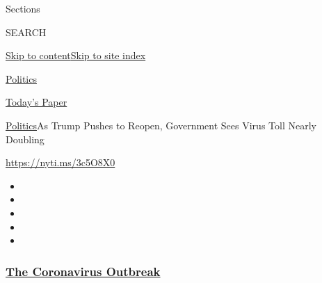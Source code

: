 Sections

SEARCH

\protect\hyperlink{site-content}{Skip to
content}\protect\hyperlink{site-index}{Skip to site index}

\href{https://www.nytimes3xbfgragh.onion/section/politics}{Politics}

\href{https://myaccount.nytimes3xbfgragh.onion/auth/login?response_type=cookie\&client_id=vi}{}

\href{https://www.nytimes3xbfgragh.onion/section/todayspaper}{Today's
Paper}

\href{/section/politics}{Politics}\textbar{}As Trump Pushes to Reopen,
Government Sees Virus Toll Nearly Doubling

\url{https://nyti.ms/3c5O8X0}

\begin{itemize}
\item
\item
\item
\item
\item
\end{itemize}

\hypertarget{the-coronavirus-outbreak}{%
\subsubsection{\texorpdfstring{\href{https://www.nytimes3xbfgragh.onion/news-event/coronavirus?name=styln-coronavirus-national\&region=TOP_BANNER\&block=storyline_menu_recirc\&action=click\&pgtype=Article\&impression_id=32030dd0-f4cf-11ea-b32a-256dc0696bd9\&variant=undefined}{The
Coronavirus
Outbreak}}{The Coronavirus Outbreak}}\label{the-coronavirus-outbreak}}

